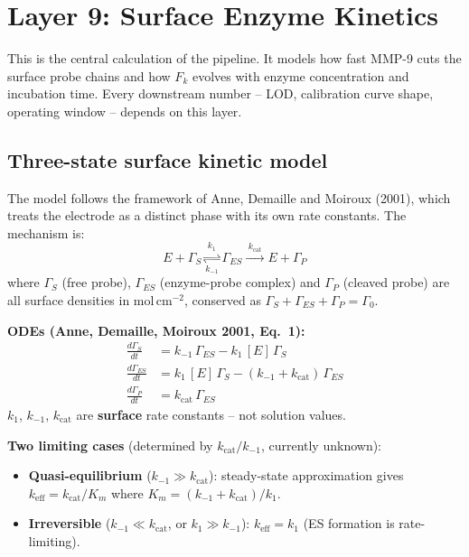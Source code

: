 \documentclass[10pt,a4paper]{article}
\newenvironment{eqbox}{%
  \begin{lrbox}{\tmpbox}\begin{minipage}{0.965\textwidth}\vspace{0.2em}}%
 {\vspace{0.2em}\end{minipage}\end{lrbox}%
  \par\vspace{0.3em}\noindent\colorbox{boxgray}{\usebox{\tmpbox}}\par\vspace{0.3em}}
\begin{document}
\section{Layer 9: Surface Enzyme Kinetics}

This is the central calculation of the pipeline. It models how fast MMP-9 cuts the surface
probe chains and how $F_k$ evolves with enzyme concentration and incubation time. Every
downstream number -- LOD, calibration curve shape, operating window -- depends on this layer.

\subsection{Three-state surface kinetic model}

The model follows the framework of Anne, Demaille and Moiroux (2001), which treats the
electrode as a distinct phase with its own rate constants. The mechanism is:
\[
E + \Gamma_S \underset{k_{-1}}{\overset{k_1}{\rightleftharpoons}} \Gamma_{ES}
\xrightarrow{\;k_\text{cat}\;} E + \Gamma_P
\]
where $\Gamma_S$ (free probe), $\Gamma_{ES}$ (enzyme-probe complex) and $\Gamma_P$ (cleaved
probe) are all surface densities in mol\,cm$^{-2}$, conserved as
$\Gamma_S + \Gamma_{ES} + \Gamma_P = \Gamma_0$.

\begin{eqbox}
\textbf{ODEs (Anne, Demaille, Moiroux 2001, Eq.~1):}
\begin{align}
\frac{d\Gamma_S}{dt}    &= k_{-1}\,\Gamma_{ES} - k_1\,[E]\,\Gamma_S \\
\frac{d\Gamma_{ES}}{dt} &= k_1\,[E]\,\Gamma_S - (k_{-1} + k_\text{cat})\,\Gamma_{ES} \\
\frac{d\Gamma_P}{dt}    &= k_\text{cat}\,\Gamma_{ES}
\end{align}
$k_1$, $k_{-1}$, $k_\text{cat}$ are \textbf{surface} rate constants -- not solution values.

\textbf{Two limiting cases} (determined by $k_\text{cat}/k_{-1}$, currently unknown):
\begin{itemize}[noitemsep, topsep=2pt]
\item \textbf{Quasi-equilibrium} ($k_{-1} \gg k_\text{cat}$): steady-state approximation gives
  $k_\text{eff} = k_\text{cat}/K_m$ where $K_m = (k_{-1}+k_\text{cat})/k_1$.
\item \textbf{Irreversible} ($k_{-1} \ll k_\text{cat}$, or $k_1 \gg k_{-1}$):
  $k_\text{eff} = k_1$ (ES formation is rate-limiting).
\end{itemize}
\end{eqbox}
\end{document}
